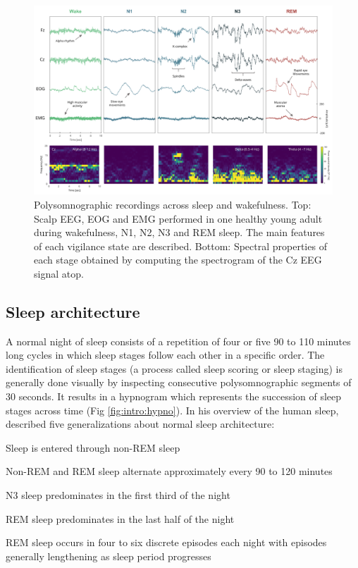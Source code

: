 \begin{figure}
	\centering
	\includegraphics[width=\linewidth, height=0.8\textheight, keepaspectratio]{Fig/Intro/Intro_Sleep_Stages_PSD/Intro_Sleep_Stages_PSD.png}
	\captionsetup{width=0.9\textheight}
	\caption[Polysomnographic recordings across sleep and wakefulness]{Polysomnographic recordings across sleep and wakefulness. Top: Scalp EEG, EOG and EMG performed in one healthy young adult during wakefulness, N1, N2, N3 and REM sleep. The main features of each vigilance state are described. Bottom: Spectral properties of each stage obtained by computing the spectrogram of the Cz EEG signal atop.}
	\label{fig:intro:sleep_stage}
\end{figure}

\subsection{Sleep architecture}
\label{sec:dream-research:sleep:architecture}

A normal night of sleep consists of a repetition of four or five 90 to 110 minutes long cycles in which sleep stages follow each other in a specific order. The identification of sleep stages (a process called sleep scoring or sleep staging) is generally done visually by inspecting consecutive polysomnographic segments of 30 seconds. It results in a hypnogram which represents the succession of sleep stages across time (Fig \ref{fig:intro:hypno}). In his overview of the human sleep, \citet{hirshkowitz_normal_2004} described five generalizations about normal sleep architecture:

\begin{my_list_num}
    \item Sleep is entered through non-REM sleep
    \item Non-REM and REM sleep alternate approximately every 90 to 120 minutes
	\item N3 sleep predominates in the first third of the night
	\item REM sleep predominates in the last half of the night
	\item REM sleep occurs in four to six discrete episodes each night with episodes generally lengthening as sleep period progresses
\end{my_list_num}


